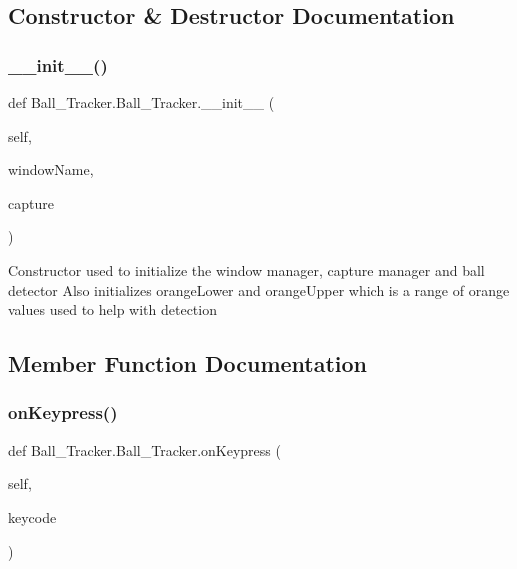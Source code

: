 \subsection{Constructor \& Destructor Documentation}
\mbox{\label{classBall__Tracker_1_1Ball__Tracker_a9f52b5e12bec7868ae835e57cb4a2eb4}} 
\subsubsection{\texorpdfstring{\+\_\+\+\_\+init\+\_\+\+\_\+()}{\_\_init\_\_()}}
{\footnotesize\ttfamily def Ball\+\_\+\+Tracker.\+Ball\+\_\+\+Tracker.\+\_\+\+\_\+init\+\_\+\+\_\+ (\begin{DoxyParamCaption}\item[{}]{self,  }\item[{}]{window\+Name,  }\item[{}]{capture }\end{DoxyParamCaption})}

\begin{DoxyVerb}Constructor used to initialize the window manager, capture manager and ball detector
Also initializes orangeLower and orangeUpper which is a range of orange values used to help with detection
\end{DoxyVerb}
 

\subsection{Member Function Documentation}
\mbox{\label{classBall__Tracker_1_1Ball__Tracker_a7defc81aec0000c97a325487dd57ee5c}} 
\subsubsection{\texorpdfstring{on\+Keypress()}{onKeypress()}}
{\footnotesize\ttfamily def Ball\+\_\+\+Tracker.\+Ball\+\_\+\+Tracker.\+on\+Keypress (\begin{DoxyParamCaption}\item[{}]{self,  }\item[{}]{keycode }\end{DoxyParamCaption})}

